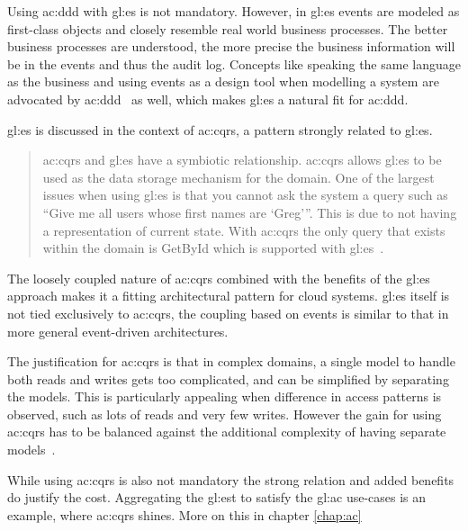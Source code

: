 
Using \gls{ac:ddd} with \gls{gl:es} is not mandatory. However, in \gls{gl:es} events are modeled as first-class objects and closely resemble real world business processes. The better business processes are understood, the more precise the business information will be in the events and thus the audit log. Concepts like speaking the same language as the business and using events as a design tool when modelling a system are advocated by \gls{ac:ddd}~\citep{evans2004domain} as well, which makes \gls{gl:es} a natural fit for \gls{ac:ddd}.


\gls{gl:es} is discussed in the context of \gls{ac:cqrs}, a pattern strongly related to \gls{gl:es}.

\begin{quote}
\gls{ac:cqrs} and \gls{gl:es} have a symbiotic relationship. \gls{ac:cqrs} allows \gls{gl:es} to be used as the
data storage mechanism for the domain. One of the largest issues when using \gls{gl:es} is that you
cannot ask the system a query such as “Give me all users whose first names are ‘Greg’”. This is due to
not having a representation of current state. With \gls{ac:cqrs} the only query that exists within the domain is
GetById which is supported with \gls{gl:es}~\citep{young2010cqrs}.
\end{quote}

The loosely coupled nature of \gls{ac:cqrs} combined with the benefits of the \gls{gl:es} approach makes it a fitting architectural pattern for cloud systems. \gls{gl:es} itself is not tied exclusively to \gls{ac:cqrs}, the coupling based on events is similar to that in more general event-driven architectures.

The justification for \gls{ac:cqrs} is that in complex domains, a single model to handle both reads and writes gets too complicated, and can be simplified by separating the models. This is particularly appealing when difference in access patterns is observed, such as lots of reads and very few writes. However the gain for using \gls{ac:cqrs} has to be balanced against the additional complexity of having separate models~\citep{esvsed}.

While using \gls{ac:cqrs} is also not mandatory the strong relation and added benefits do justify the cost. Aggregating the \gls{gl:est} to satisfy the \gls{gl:ac} use-cases is an example, where \gls{ac:cqrs} shines. More on this in chapter \ref{chap:ac}

